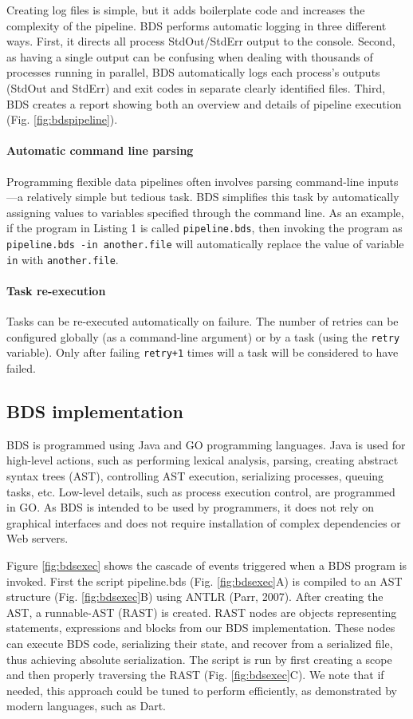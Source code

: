 Creating log files is simple, but it adds boilerplate code and increases the complexity of the pipeline. BDS performs automatic logging in three different ways. First, it directs all process StdOut/StdErr output to the console. Second, as having a single output can be confusing when dealing with thousands of processes running in parallel, BDS automatically logs each process’s outputs (StdOut and StdErr) and exit codes in separate clearly identified files. Third, BDS creates a report showing both an overview and details of pipeline execution (Fig. \ref{fig:bdspipeline}).

\paragraph{Automatic command line parsing} Programming flexible data pipelines often involves parsing command-line inputs—a relatively simple but tedious task. BDS simplifies this task by automatically assigning values to variables specified through the command line. As an example, if the program in Listing 1 is called \texttt{pipeline.bds}, then invoking the program as \texttt{pipeline.bds -in another.file} will automatically replace the value of variable \texttt{in} with \texttt{another.file}.

\paragraph{Task re-execution} Tasks can be re-executed automatically on failure. The number of retries can be configured globally (as a command-line argument) or by a task (using the \texttt{retry} variable). Only after failing \texttt{retry+1} times will a task will be considered to have failed.

\subsection{BDS implementation}

BDS is programmed using Java and GO programming languages. Java is used for high-level actions, such as performing lexical analysis, parsing, creating abstract syntax trees (AST), controlling AST execution, serializing processes, queuing tasks, etc. Low-level details, such as process execution control, are programmed in GO. As BDS is intended to be used by programmers, it does not rely on graphical interfaces and does not require installation of complex dependencies or Web servers.

Figure \ref{fig:bdsexec} shows the cascade of events triggered when a BDS program is invoked. First the script pipeline.bds (Fig. \ref{fig:bdsexec}A) is compiled to an AST structure (Fig. \ref{fig:bdsexec}B) using ANTLR (Parr, 2007). After creating the AST, a runnable-AST (RAST) is created. RAST nodes are objects representing statements, expressions and blocks from our BDS implementation. These nodes can execute BDS code, serializing their state, and recover from a serialized file, thus achieving absolute serialization. The script is run by first creating a scope and then properly traversing the RAST (Fig. \ref{fig:bdsexec}C). We note that if needed, this approach could be tuned to perform efficiently, as demonstrated by modern languages, such as Dart.


